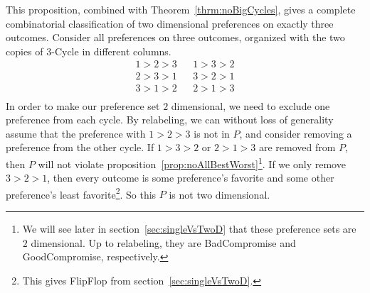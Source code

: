 \documentclass[12pt]{article}
\newtheorem{theorem}{Theorem}
\newcommand{\1}[1]{\mathds{1}[{#1}]}
\begin{document}
    This proposition, combined with Theorem~\ref{thrm:noBigCycles}, gives a
    complete combinatorial classification of two dimensional preferences on
    exactly three outcomes. Consider all preferences on three outcomes,
    organized with the two copies of $3$-{\sc Cycle} in different columns.
    \begin{align*}
      1 > 2 > 3 && 1 > 3 > 2 \\
      2 > 3 > 1 && 3 > 2 > 1 \\
      3 > 1 > 2 && 2 > 1 > 3 \\
    \end{align*}
    In order to make our preference set $2$ dimensional, we need to exclude one
    preference from each cycle.
    By relabeling, we can without loss of generality assume that the
    preference with $1 > 2 > 3$ is not in $P$, and consider removing a
    preference from the other cycle.
    If $1 > 3 > 2$ or $2 > 1 > 3$ are removed from $P$, then $P$ will not
    violate proposition~\ref{prop:noAllBestWorst}\footnote{
      We will see later in section~\ref{sec:singleVsTwoD}
      that these preference sets are $2$ dimensional. Up to relabeling, they are
      {\sc BadCompromise} and {\sc GoodCompromise}, respectively.
    }.
    If we only remove $3 > 2 > 1$, then every outcome is some preference's
    favorite and some other preference's least favorite\footnote{
      This gives {\sc FlipFlop} from section~\ref{sec:singleVsTwoD}.
    }.
    So this $P$ is not two dimensional.

\end{document}
